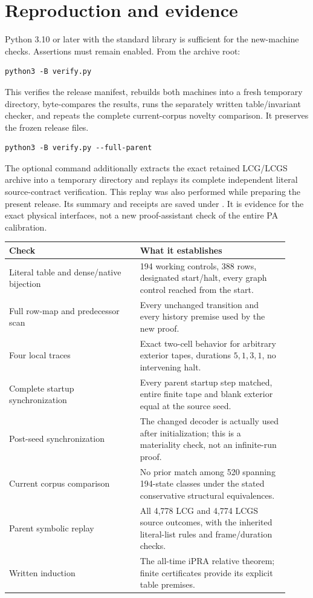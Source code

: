 \documentclass[11pt]{article}
\begin{document}
\section{Reproduction and evidence}
\label{sec:reproduction}
Python 3.10 or later with the standard library is sufficient for the
new-machine checks. Assertions must remain enabled. From the archive root:
\begin{verbatim}
python3 -B verify.py
\end{verbatim}
This verifies the release manifest, rebuilds both machines into a fresh
temporary directory, byte-compares the results, runs the separately
written table/invariant checker, and repeats the complete current-corpus
novelty comparison. It preserves the frozen release files.

\begin{verbatim}
python3 -B verify.py --full-parent
\end{verbatim}
The optional command additionally extracts the exact retained LCG/LCGS
archive into a temporary directory and replays its complete independent
literal source-contract verification. This replay was also performed
while preparing the present release. Its summary and receipts are saved
under . It is evidence for the exact
physical interfaces, not a new proof-assistant check of the entire PA
calibration.

\begin{center}
\begin{tabular}{p{0.43\linewidth}p{0.49\linewidth}}
\toprule
Check & What it establishes\\
\midrule
Literal table and dense/native bijection &194 working controls, 388 rows,
designated start/halt, every graph control reached from the start.\\
Full row-map and predecessor scan &Every unchanged transition and every
history premise used by the new proof.\\
Four local traces &Exact two-cell behavior for arbitrary exterior tapes,
durations $5,1,3,1$, no intervening halt.\\
Complete startup synchronization &Every parent startup step matched,
entire finite tape and blank exterior equal at the source seed.\\
Post-seed synchronization &The changed decoder is actually used after
initialization; this is a materiality check, not an infinite-run proof.\\
Current corpus comparison &No prior match among 520 spanning 194-state
classes under the stated conservative structural equivalences.\\
Parent symbolic replay &All 4,778 LCG and 4,774 LCGS source outcomes,
with the inherited literal-list rules and frame/duration checks.\\
Written induction &The all-time iPRA relative theorem; finite certificates
provide its explicit table premises.\\
\bottomrule
\end{tabular}
\end{center}
\end{document}
